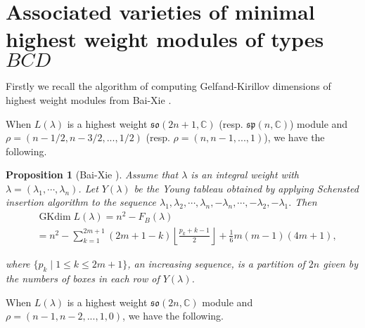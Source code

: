 \documentclass{amsart}[12pt]
\newtheorem{Pro}{Proposition}[section]
\newtheorem{Rem}{Remark}[section]
\newcommand{\gkd}{\operatorname{GKdim}}
\numberwithin{equation}{section}
\begin{document}
%

\section{ Associated varieties of minimal highest weight modules of types $BCD$ }
Firstly we recall the algorithm of computing Gelfand-Kirillov dimensions of highest weight modules from Bai-Xie \cite{BX-2}.

	When $L(\lambda)$ is a highest weight $\mathfrak{so}(2n+1,\mathbb{C})$ (resp. $\mathfrak{sp}(n,\mathbb{C})$) module and $\rho=(n-1/2,n-3/2,...,1/2)$ (resp. $\rho=(n,n-1,...,1)$),  we have the following.

\begin{Pro}[Bai-Xie \cite{BX-2}]
	Assume that $ \lambda $ is an integral weight with $  \lambda=(\lambda_1,\cdots,\lambda_n)$.
	Let $ Y(\lambda) $ be the  Young tableau obtained by applying Schensted insertion algorithm to the sequence \(
	\lambda_1,\lambda_2,\cdots,\lambda_n,-\lambda_n,\cdots,-\lambda_2,-\lambda_1.\)
	Then
	\begin{align*}
	&\gkd L(\lambda)=n^2-F_B(\lambda)\\
	&=n^2-\sum\limits_{k=1}^{2m+1} (2m+1-k)\left \lfloor \frac{p_k+k-1}{2}\right \rfloor +\frac{1}{6}m(m-1)(4m+1),
	\end{align*}
	
	
	where $ \{p_k\mid 1\leq k\leq 2m+1\} $, an increasing sequence, is  a partition of $ 2n $ given by the numbers of boxes in each row of $ Y(\lambda) $.
\end{Pro}

	When $L(\lambda)$ is a highest weight $\mathfrak{so}(2n,\mathbb{C})$ module and $\rho=(n-1,n-2,...,1,0)$, we have the following.
\end{document}
